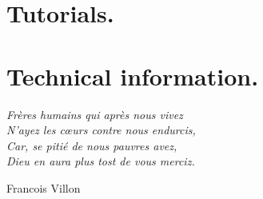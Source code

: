\documentclass{scrartcl}
\begin{document}


\newpage


\newpage
\tableofcontents

% 

\newpage
\part{Tutorials.}

\newpage


\newpage


% 

% 

\newpage



\newpage
\part{Technical information.}
\vfill
\epigraph{
\textit{Frères humains qui après nous vivez \\ 
N'ayez les cœurs contre nous endurcis, \\
Car, se pitié de nous pauvres avez, \\ 
Dieu en aura plus tost de vous merciz.}
}{Francois Villon}

\newpage

\clearpage 

\end{document}

